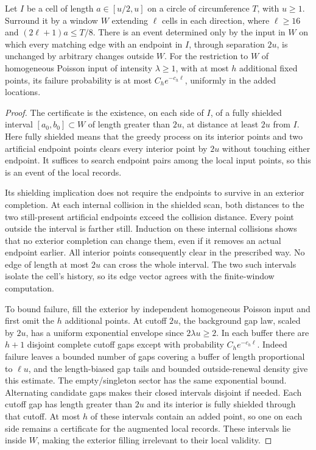 \documentclass[11pt,letterpaper]{article}
\begin{document}
\begin{lemma}
\label{lem:local-shielding-certificate}
Let $I$ be a cell of length $a\in[u/2,u]$ on a circle of
circumference $T$, with $u\ge1$.
Surround it by a window $W$ extending $\ell$ cells in each
direction, where $\ell\ge16$ and
$(2\ell+1)a\le T/8$.
There is an event determined only by the input in $W$
on which every matching edge with an endpoint in $I$,
through separation $2u$, is unchanged by arbitrary changes
outside $W$.
For the restriction to $W$ of homogeneous Poisson input
of intensity $\lambda\ge1$, with at most $h$ additional
fixed points, its failure probability is at most
$C_he^{-c_h\ell}$, uniformly in the added locations.
\end{lemma}
\begin{proof}
The certificate is the existence, on each side of $I$,
of a fully shielded interval $[a_0,b_0]\subset W$ of length
greater than $2u$, at distance at least $2u$ from $I$.
Here fully shielded means that the greedy process on its
interior points and two artificial endpoint points clears
every interior point by $2u$ without touching either endpoint.
It suffices to search endpoint pairs among the local input
points, so this is an event of the local records.

Its shielding implication does not require the endpoints
to survive in an exterior completion.
At each internal collision in the shielded scan, both
distances to the two still-present artificial endpoints
exceed the collision distance. Every point outside the
interval is farther still. Induction on these internal
collisions shows that no exterior completion can change
them, even if it removes an actual endpoint earlier.
All interior points consequently clear in the prescribed
way. No edge of length at most $2u$ can cross the whole
interval. The two such intervals isolate the cell's history,
so its edge vector agrees with the finite-window computation.

To bound failure, fill the exterior by independent homogeneous
Poisson input and first omit the $h$ additional points.
At cutoff $2u$, the background gap law, scaled by $2u$,
has a uniform exponential envelope since $2\lambda u\ge2$.
In each buffer there are $h+1$ disjoint complete cutoff
gaps except with probability $C_he^{-c_h\ell}$.
Indeed failure leaves a bounded number of gaps covering a
buffer of length proportional to $\ell u$, and the
length-biased gap tails and bounded outside-renewal density
give this estimate. The empty/singleton sector has the
same exponential bound. Alternating candidate gaps makes
their closed intervals disjoint if needed.
Each cutoff gap has length greater than $2u$ and its
interior is fully shielded through that cutoff.
At most $h$ of these intervals contain an added point,
so one on each side remains a certificate for the augmented
local records. These intervals lie inside $W$, making
the exterior filling irrelevant to their local validity.
\end{proof}
\end{document}
